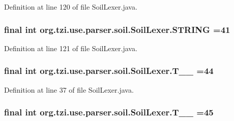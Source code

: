 Definition at line 120 of file Soil\-Lexer.\-java.

\hypertarget{classorg_1_1tzi_1_1use_1_1parser_1_1soil_1_1_soil_lexer_af47d498667e7dd000ae3ed72aa1e3756}{
\subsubsection[{S\-T\-R\-I\-N\-G}]{\setlength{\rightskip}{0pt plus 5cm}final int org.\-tzi.\-use.\-parser.\-soil.\-Soil\-Lexer.\-S\-T\-R\-I\-N\-G =41\hspace{0.3cm}{\ttfamily [static]}}}\label{classorg_1_1tzi_1_1use_1_1parser_1_1soil_1_1_soil_lexer_af47d498667e7dd000ae3ed72aa1e3756}


Definition at line 121 of file Soil\-Lexer.\-java.

\hypertarget{classorg_1_1tzi_1_1use_1_1parser_1_1soil_1_1_soil_lexer_a0fa6df60ca0196a036feea085a4b7d24}{
\subsubsection[{T\-\_\-\-\_\-44}]{\setlength{\rightskip}{0pt plus 5cm}final int org.\-tzi.\-use.\-parser.\-soil.\-Soil\-Lexer.\-T\-\_\-\-\_ =44\hspace{0.3cm}{\ttfamily [static]}}}\label{classorg_1_1tzi_1_1use_1_1parser_1_1soil_1_1_soil_lexer_a0fa6df60ca0196a036feea085a4b7d24}


Definition at line 37 of file Soil\-Lexer.\-java.

\hypertarget{classorg_1_1tzi_1_1use_1_1parser_1_1soil_1_1_soil_lexer_a9ca61777f39c55cbe56401f93bdb7788}{
\subsubsection[{T\-\_\-\-\_\-45}]{\setlength{\rightskip}{0pt plus 5cm}final int org.\-tzi.\-use.\-parser.\-soil.\-Soil\-Lexer.\-T\-\_\-\-\_ =45\hspace{0.3cm}{\ttfamily [static]}}}\label{classorg_1_1tzi_1_1use_1_1parser_1_1soil_1_1_soil_lexer_a9ca61777f39c55cbe56401f93bdb7788}


